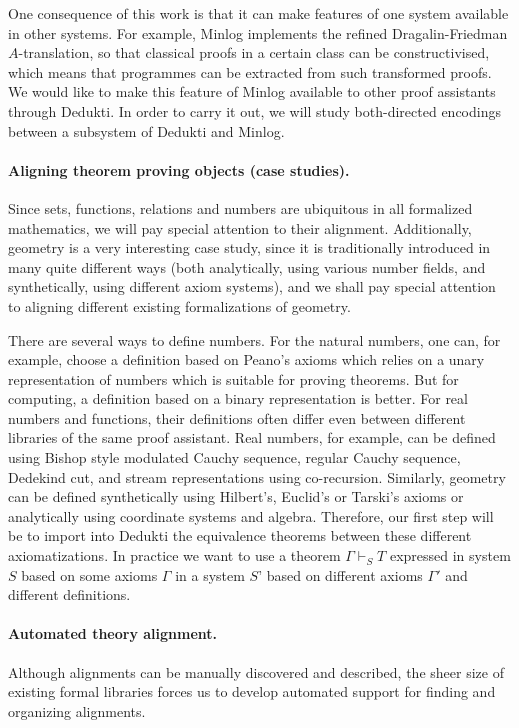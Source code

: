 One consequence of this work is that it can make features of one
system available in other systems. For example, Minlog implements the
refined Dragalin-Friedman $A$-translation, so that classical proofs in
a certain class can be constructivised, which means that programmes can
be extracted from such transformed proofs.  We would like to make this
feature of Minlog available to other proof assistants through Dedukti.
In order to carry it out, we will study both-directed encodings
between a subsystem of Dedukti and Minlog.

\paragraph*{Aligning theorem proving objects (case studies).}
Since sets, functions, relations and numbers are ubiquitous in all
formalized mathematics, we will pay special attention to their
alignment. Additionally, geometry is a very interesting case study,
since it is traditionally introduced in many quite different ways
(both analytically, using various number fields, and synthetically,
using different axiom systems), and we shall pay special attention
to aligning different existing formalizations of geometry.

There are several ways to define numbers. For the natural numbers,
one can, for example, choose a definition based on Peano’s axioms which
relies on a unary representation of numbers which is suitable for
proving theorems. But for computing, a definition based on a binary
representation is better. For real numbers and functions, their
definitions often differ even between different libraries of the same
proof assistant.  Real numbers, for example, can be defined using 
Bishop style modulated Cauchy sequence, regular Cauchy sequence,
Dedekind cut, and stream representations using co-recursion.
Similarly, geometry can be defined synthetically using Hilbert’s,
Euclid’s or Tarski’s axioms or analytically using coordinate systems and
algebra.  Therefore, our first step will be to import into Dedukti the
equivalence theorems between these different axiomatizations. In
practice we want to use a theorem $\Gamma \vdash_S T$ expressed in
system $S$ based on some axioms $\Gamma$ in a system $S’$ based on
different axioms $\Gamma'$ and different definitions.

\paragraph*{Automated theory alignment.}
Although alignments can be manually discovered and described, the
sheer size of existing formal libraries forces us to develop automated
support for finding and organizing alignments.



